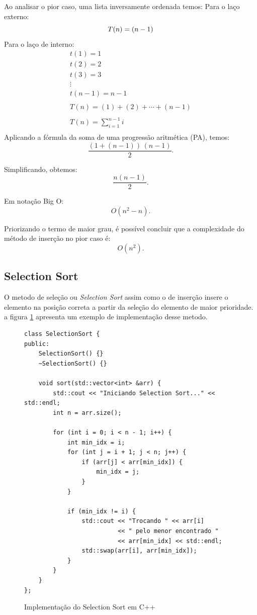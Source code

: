 \documentclass[
	article,			%
	11pt,				%
	oneside,			%
	a4paper,			%
	english,			%
	brazil,				%
	sumario=tradicional
	]{abntex2}
\begin{document}
Ao analisar o pior caso, uma lista inversamente ordenada temos:
Para o laço externo:
\[
T(n) = (n - 1) \\
\]
Para o laço de interno:
\begin{equation}
\begin{gathered}
t(1) = 1 \\
t(2) = 2 \\
t(3) = 3 \\
\vdots \\
t(n-1) = n -1 \\
\\
T(n) = (1) + (2) + \cdots + (n - 1) \\
\\
T(n) = \sum_{i=1}^{n-1} i \\
\end{gathered}
\end{equation}
Aplicando a fórmula da soma de uma progressão aritmética (PA), temos:
\[
\frac{(1 + (n - 1))\,(n -1)}{2}.
\]

Simplificando, obtemos:
\[
\frac{n(n-1)}{2}.
\]

Em notação Big O:
\[
O(n^2 - n).
\]

Priorizando o termo de maior grau, é possível concluir que a complexidade do método de inserção no pior caso é:
\[
O(n^2).
\]
\subsection{Selection Sort}
 O metodo de seleção ou \textit{Selection Sort} assim como o de inserção insere o elemento na posição correta a partir da seleção do elemento de maior prioridade. a figura \ref{fig:selectionsort} apresenta um exemplo de implementação desse metodo. 

\begin{figure}[H]
\centering
\begin{lstlisting}[]
class SelectionSort {
public:
    SelectionSort() {}
    ~SelectionSort() {}

    void sort(std::vector<int> &arr) {
        std::cout << "Iniciando Selection Sort..." << std::endl;
        int n = arr.size();

        for (int i = 0; i < n - 1; i++) {
            int min_idx = i;
            for (int j = i + 1; j < n; j++) {
                if (arr[j] < arr[min_idx]) {
                    min_idx = j;
                }
            }

            if (min_idx != i) {
                std::cout << "Trocando " << arr[i] 
                          << " pelo menor encontrado " 
                          << arr[min_idx] << std::endl;
                std::swap(arr[i], arr[min_idx]);
            }
        }
    }
};
\end{lstlisting}
\caption{Implementação do Selection Sort em C++}
\label{fig:selectionsort}
\end{figure}
\end{document}
